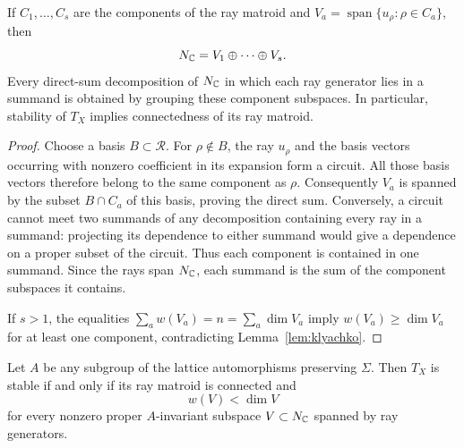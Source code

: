 \begin{lemma}\label{lem:raycomponents}
If $C_1,\ldots,C_s$ are the components of the ray matroid and
$V_a=\operatorname{span}\{u_\rho:\rho\in C_a\}$, then
\[
 N_{\mathbb{C}}=V_1\oplus\cdots\oplus V_s.
\]
Every direct-sum decomposition of $N_{\mathbb{C}}$ in which each ray generator
lies in a summand is obtained by grouping these component subspaces.
In particular, stability of $T_X$ implies connectedness of its ray matroid.
\end{lemma}

\begin{proof}
Choose a basis $B\subset\mathcal R$. For $\rho\notin B$, the ray $u_\rho$
and the basis vectors occurring with nonzero coefficient in its
expansion form a circuit. All those basis vectors therefore belong to
the same component as $\rho$. Consequently $V_a$ is spanned by the
subset $B\cap C_a$ of this basis, proving the direct sum.
Conversely, a circuit cannot meet two summands of any decomposition
containing every ray in a summand: projecting its dependence to either
summand would give a dependence on a proper subset of the circuit.
Thus each component is contained in one summand. Since the rays span
$N_{\mathbb{C}}$, each summand is the sum of the component subspaces it contains.

If $s>1$, the equalities $\sum_a w(V_a)=n=\sum_a\dim V_a$ imply
$w(V_a)\ge\dim V_a$ for at least one component, contradicting
Lemma~\ref{lem:klyachko}.
\end{proof}

\begin{proposition}\label{prop:symmetry}
Let $A$ be any subgroup of the lattice automorphisms preserving
$\Sigma$. Then $T_X$ is stable if and only if its ray matroid is
connected and
\[
 w(V)<\dim V
\]
for every nonzero proper $A$-invariant subspace $V\subset N_{\mathbb{C}}$
spanned by ray generators.
\end{proposition}

